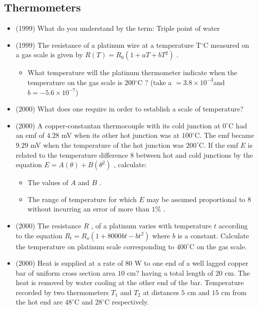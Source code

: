 \documentclass{article}
\begin{document}
\subsection{Thermometers}
\begin{itemize}
\item (1999)  What do you understand by the term:   Triple point of water
\item (1999)  The resistance of a platinum wire at a temperature T​$ ^{\circ}$C measured on a gas scale is given by $ R(T)=R​_{0​}(1+ a T+bT​^{2}​)$ .\begin{itemize}
\item What temperature will the platinum thermometer indicate when the temperature on the gas scale is $ 200​^{\circ}$C ? (take a $ =3.8 \times 10^{-3}$ ​ and $ b=-5.6 \times 10^{-7}$ ​)
\end{itemize}
\item (2000)  What does one require in order to establish a scale of temperature?
\item (2000)  A copper-constantan thermocouple with its cold junction at $ 0^{\circ}$C had an emf of $ 4.28$ mV when its other hot junction was at $ 100^{\circ}$C. The emf became $ 9.29$ mV when the temperature of the hot junction was $ 200^{\circ}$C. If the emf $ E$ is related to the temperature difference $ 8$ between hot and cold junctions by the equation $ E= A(\theta )+B(\theta ^{2})$ , calculate:\begin{itemize}
\item The values of $ A$ and $ B$ .
\item The range of temperature for which $ E$ may be assumed proportional to $ 8$ without incurring an error of more than $ 1\%$ .
\end{itemize}
\item (2000)  The resistance $ R$ , of a platinum varies with temperature $ t$ according to the equation $ R_{t}=R_{o}(1+8000bt -b t^{2})$ where $ b$ is a constant. Calculate the temperature on platinum scale corresponding to $ 400^{\circ}$C on the gas scale. 
\item (2000)  Heat is supplied at a rate of $ 80$ W to one end of a well lagged copper bar of uniform cross section area $ 10$ cm? having a total length of $ 20$ cm. The heat is removed by water cooling at the other end of the bar. Temperature recorded by two thermometers $ T_{1}$ and $ T_{2}$ at distances $ 5$ cm and $ 15$ cm from the hot end are $ 48^{\circ}$C and $ 28^{\circ}$C respectively.\begin{itemize}

\end{itemize}
\end{itemize}
\end{document}

